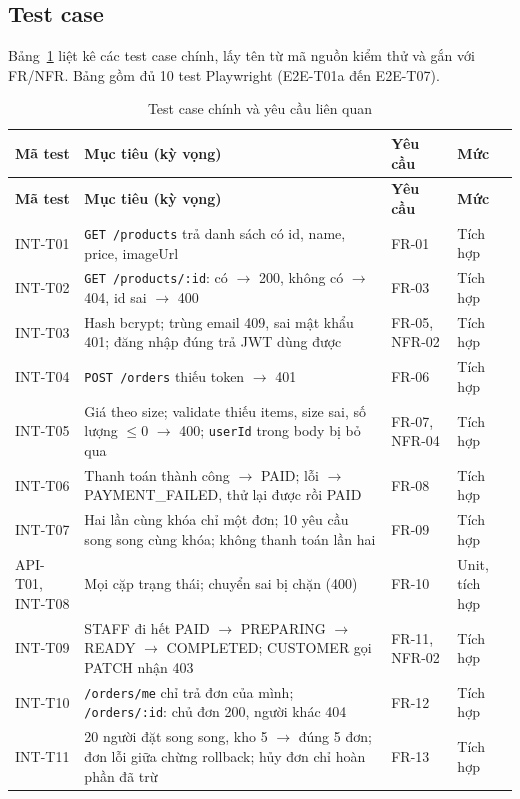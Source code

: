 \documentclass[a4paper]{article}
\begin{document}
\subsection{Test case}\label{sec:se-testcase}
Bảng~\ref{tab:testcase} liệt kê các test case chính, lấy tên từ mã nguồn kiểm thử và gắn với FR/NFR. Bảng gồm đủ 10 test Playwright (E2E-T01a đến E2E-T07).
{\small
\begin{longtable}{@{}p{1.59cm}p{6.37cm}p{1.69cm}p{3.38cm}@{}}
\caption{Test case chính và yêu cầu liên quan}\label{tab:testcase}\\
\toprule \textbf{Mã test} & \textbf{Mục tiêu (kỳ vọng)} & \textbf{Yêu cầu} & \textbf{Mức} \\ \midrule \endfirsthead
\toprule \textbf{Mã test} & \textbf{Mục tiêu (kỳ vọng)} & \textbf{Yêu cầu} & \textbf{Mức} \\ \midrule \endhead
\bottomrule \endlastfoot
INT-T01 & \texttt{GET /products} trả danh sách có id, name, price, imageUrl & FR-01 & Tích hợp \\
INT-T02 & \texttt{GET /products/:id}: có $\to$ 200, không có $\to$ 404, id sai $\to$ 400 & FR-03 & Tích hợp \\
INT-T03 & Hash bcrypt; trùng email 409, sai mật khẩu 401; đăng nhập đúng trả JWT dùng được & FR-05, NFR-02 & Tích hợp \\
INT-T04 & \texttt{POST /orders} thiếu token $\to$ 401 & FR-06 & Tích hợp \\
INT-T05 & Giá theo size; validate thiếu items, size sai, số lượng $\leq 0$ $\to$ 400; \texttt{userId} trong body bị bỏ qua & FR-07, NFR-04 & Tích hợp \\
INT-T06 & Thanh toán thành công $\to$ PAID; lỗi $\to$ PAYMENT\_FAILED, thử lại được rồi PAID & FR-08 & Tích hợp \\
INT-T07 & Hai lần cùng khóa chỉ một đơn; 10 yêu cầu song song cùng khóa; không thanh toán lần hai & FR-09 & Tích hợp \\
API-T01, INT-T08 & Mọi cặp trạng thái; chuyển sai bị chặn (400) & FR-10 & Unit, tích hợp \\
INT-T09 & STAFF đi hết PAID $\to$ PREPARING $\to$ READY $\to$ COMPLETED; CUSTOMER gọi PATCH nhận 403 & FR-11, NFR-02 & Tích hợp \\
INT-T10 & \texttt{/orders/me} chỉ trả đơn của mình; \texttt{/orders/:id}: chủ đơn 200, người khác 404 & FR-12 & Tích hợp \\
INT-T11 & 20 người đặt song song, kho 5 $\to$ đúng 5 đơn; đơn lỗi giữa chừng rollback; hủy đơn chỉ hoàn phần đã trừ & FR-13 & Tích hợp \\

\end{longtable}}
\end{document}
